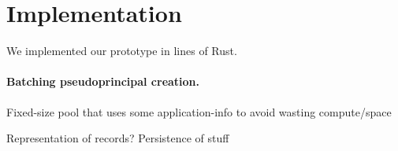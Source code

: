 \section{Implementation}

%
We implemented our \sys prototype in  lines of Rust.
%

\paragraph{Batching pseudoprincipal creation.}
%
Fixed-size pool that uses some application-info to avoid wasting compute/space

Representation of records? Persistence of stuff


